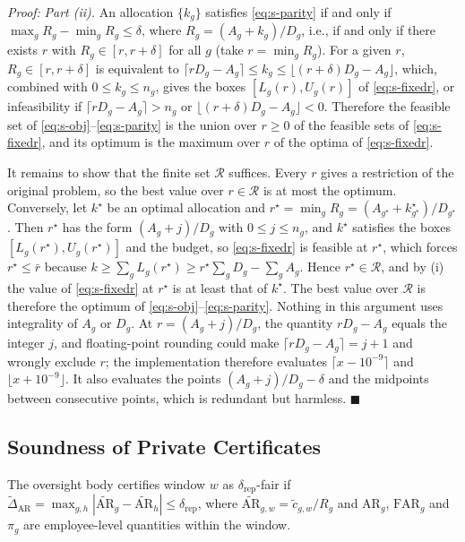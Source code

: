 \documentclass[10pt,onecolumn,letterpaper]{article}
\newenvironment{IEEEproof}[1][Proof]{\par\textit{#1:}}{\par}
\newcommand{\AR}{\mathrm{AR}}
\newcommand{\FAR}{\mathrm{FAR}}
\begin{document}
\begin{IEEEproof}
\emph{Part (ii).} An allocation $\{k_g\}$ satisfies \eqref{eq:s-parity} if and only if $\max_g R_g-\min_g R_g\le\delta$, where $R_g=(A_g+k_g)/D_g$, i.e., if and only if there exists $r$ with $R_g\in[r,r+\delta]$ for all $g$ (take $r=\min_gR_g$). For a given $r$, $R_g\in[r,r+\delta]$ is equivalent to $\lceil rD_g-A_g\rceil\le k_g\le\lfloor(r+\delta)D_g-A_g\rfloor$, which, combined with $0\le k_g\le n_g$, gives the boxes $[L_g(r),U_g(r)]$ of \eqref{eq:s-fixedr}, or infeasibility if $\lceil rD_g-A_g\rceil>n_g$ or $\lfloor(r+\delta)D_g-A_g\rfloor<0$. Therefore the feasible set of \eqref{eq:s-obj}--\eqref{eq:s-parity} is the union over $r\ge0$ of the feasible sets of \eqref{eq:s-fixedr}, and its optimum is the maximum over $r$ of the optima of \eqref{eq:s-fixedr}.

It remains to show that the finite set $\mathcal{R}$ suffices. Every $r$ gives a restriction of the original problem, so the best value over $r\in\mathcal{R}$ is at most the optimum. Conversely, let $k^\star$ be an optimal allocation and $r^\star=\min_gR_g=(A_{g^\star}+k^\star_{g^\star})/D_{g^\star}$. Then $r^\star$ has the form $(A_g+j)/D_g$ with $0\le j\le n_g$, and $k^\star$ satisfies the boxes $[L_g(r^\star),U_g(r^\star)]$ and the budget, so \eqref{eq:s-fixedr} is feasible at $r^\star$, which forces $r^\star\le\bar r$ because $k\ge\sum_gL_g(r^\star)\ge r^\star\sum_gD_g-\sum_gA_g$. Hence $r^\star\in\mathcal{R}$, and by (i) the value of \eqref{eq:s-fixedr} at $r^\star$ is at least that of $k^\star$. The best value over $\mathcal{R}$ is therefore the optimum of \eqref{eq:s-obj}--\eqref{eq:s-parity}. Nothing in this argument uses integrality of $A_g$ or $D_g$. At $r=(A_g+j)/D_g$, the quantity $rD_g-A_g$ equals the integer $j$, and floating-point rounding could make $\lceil rD_g-A_g\rceil=j+1$ and wrongly exclude $r$; the implementation therefore evaluates $\lceil x-10^{-9}\rceil$ and $\lfloor x+10^{-9}\rfloor$. It also evaluates the points $(A_g+j)/D_g-\delta$ and the midpoints between consecutive points, which is redundant but harmless. \hfill$\blacksquare$

\end{IEEEproof}

\subsection{Soundness of Private Certificates}
The oversight body certifies window $w$ as $\delta_{\mathrm{rep}}$-fair if $\widetilde{\Delta}_{\AR}=\max_{g,h}|\widetilde{\AR}_g-\widetilde{\AR}_h|\le\delta_{\mathrm{rep}}$, where $\widetilde{\AR}_{g,w}=\tilde c_{g,w}/R_g$ and $\AR_g$, $\FAR_g$ and $\pi_g$ are employee-level quantities within the window.
\end{document}
